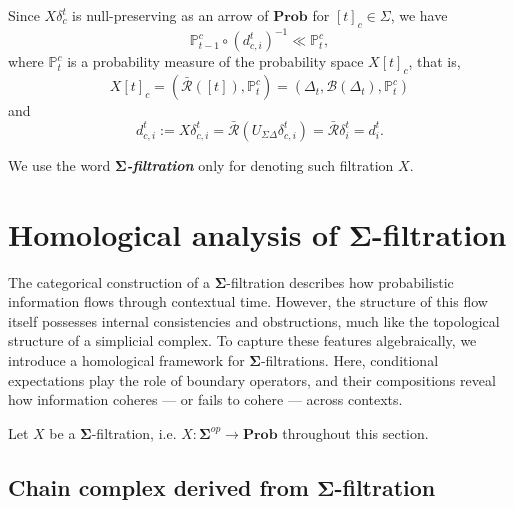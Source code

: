 \documentclass[12pt, a4paper]{amsart}
\theoremstyle{plain}
\theoremstyle{definition}
\numberwithin{figure}{section}
\numberwithin{table}{section}
\newcommand{\twc}[2]{ %
  [ #1 ]_{ #2 }
}
\newcommand{\newword}[1]{\textbf{\textit{#1}}}
\numberwithin{equation}{section}
\newcommand{\Prob}{\mathbf{Prob}}
\newcommand{\bSigma}{\mathbf{\Sigma}}
\begin{document}
Since
$
X
\delta^t_c
$
is null-preserving as an arrow of $\Prob$
for
$
\twc{t}{c}
	\in
\Sigma
$,
we have
\begin{equation}
\label{eq:muXdelta}
\mathbb{P}^c_{t-1}
	\circ
(d^t_{c,i})^{-1}
	\ll
\mathbb{P}^c_{t} ,
\end{equation}
where
$
\mathbb{P}^c_{t}
$
is a probability measure
of the probability space
$
X \twc{t}{c}
$,
that is,
\begin{equation}
\label{eq:XsingleTCsigma}
X \twc{t}{c}
	=
(
	\bar{\mathcal{R}}([t]),
	\mathbb{P}^c_{t}
)
	=
(
	\Delta_t,
	\mathcal{B}(\Delta_t),
	\mathbb{P}^c_{t}
)
\end{equation}
and
\[
d^t_{c,i}
	:=
X
\delta^t_{c,i}
	=
\bar{\mathcal{R}}
(
	U_{\Sigma \Delta}
	\delta^t_{c,i}
)
	=
\bar{\mathcal{R}}
\delta^t_{i} 
	=
d^t_{i} .
\]

We use the word
\newword{$\bSigma$-filtration}
only for denoting such filtration
$X$.



\section{Homological analysis of $\bSigma$-filtration}
\label{sec:homoSigma}

\nocite{hatcher2002}
\nocite{GQ2019}

The categorical construction of a $\bSigma$-filtration 
describes how probabilistic information flows through contextual time.
However, 
the structure of this flow itself possesses internal consistencies and obstructions, 
much like the topological structure of a simplicial complex.
To capture these features algebraically, 
we introduce a homological framework for $\bSigma$-filtrations.
Here, 
conditional expectations play the role of boundary operators, 
and their compositions reveal how information coheres — or fails to cohere — across contexts.

Let
$X$
be a $\bSigma$-filtration, i.e. 
$
X : \bSigma^{op} \to \Prob
$
throughout this section.


\subsection{Chain complex derived from $\bSigma$-filtration}
\label{sec:CCF}
\end{document}
